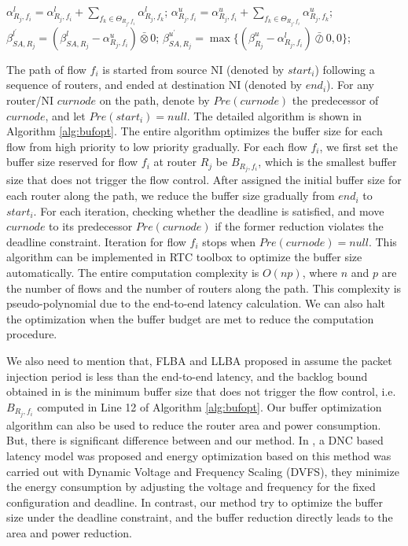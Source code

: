 \documentclass[10pt,journal]{IEEEtran}
\begin{document}
\begin{algorithm}
\begin{algorithmic}[1]
                    \STATE $\alpha^l_{R_j,f_i}=\alpha^l_{R_j,f_i}+\sum_{f_k\in\Theta_{R_j,f_i}}\alpha^l_{R_j,f_k}$;
                    \STATE $\alpha^u_{R_j,f_i}=\alpha^u_{R_j,f_i}+\sum_{f_k\in\Theta_{R_j,f_i}}\alpha^u_{R_j,f_k}$;
                \ENDIF
                \STATE $\beta^{l^\prime}_{SA,R_j}=(\beta^l_{SA,R_j}-\alpha^u_{R_j,f_i})\bar{\otimes}0$;
                \STATE $\beta^{u^\prime}_{SA,R_j}=\max\{(\beta^u_{R_j}-\alpha^l_{R_j,f_i})\bar{\oslash}0,0\}$;
            \ENDIF
        \ENDFOR
    \ENDFOR
\end{algorithmic}
\end{algorithm}

The path of flow $f_i$ is started from source NI (denoted by $start_i$) following a sequence of routers, and ended at destination NI (denoted by $end_i$). For any router/NI $curnode$ on the path, denote by $Pre(curnode)$ the predecessor of $curnode$, and let $Pre(start_i)=null$. The detailed algorithm is shown in Algorithm \ref{alg:bufopt}. The entire algorithm optimizes the buffer size for each flow from high priority to low priority gradually. For each flow $f_i$, we first set the buffer size reserved for flow $f_i$ at router $R_j$ be $B_{R_j,f_i}$, which is the smallest buffer size that does not trigger the flow control. After assigned the initial buffer size for each router along the path, we reduce the buffer size gradually from $end_i$ to $start_i$. For each iteration, checking whether the deadline is satisfied, and move $curnode$ to its predecessor $Pre(curnode)$ if the former reduction violates the deadline constraint. Iteration for flow $f_i$ stops when $Pre(curnode)=null$. This algorithm can be implemented in RTC toolbox \cite{rtc} to optimize the buffer size automatically. The entire computation complexity is $O(np)$, where $n$ and $p$ are the number of flows and the number of routers along the path. This complexity is pseudo-polynomial due to the end-to-end latency calculation. We can also halt the optimization when the buffer budget are met to reduce the computation procedure.

We also need to mention that, FLBA and LLBA proposed in \cite{189} assume the packet injection period is less than the end-to-end latency, and the backlog bound obtained in \cite{189} is the minimum buffer size that does not trigger the flow control, i.e. $B_{R_j,f_i}$ computed in Line 12 of Algorithm \ref{alg:bufopt}. Our buffer optimization algorithm can also be used to reduce the router area and power consumption. But, there is significant difference between \cite{6560630} and our method. In \cite{6560630}, a DNC based latency model was proposed and energy optimization based on this method was carried out with Dynamic Voltage and Frequency Scaling (DVFS), they minimize the energy consumption by adjusting the voltage and frequency for the fixed configuration and deadline. In contrast, our method try to optimize the buffer size under the deadline constraint, and the buffer reduction directly leads to the area and power reduction.
\end{document}
